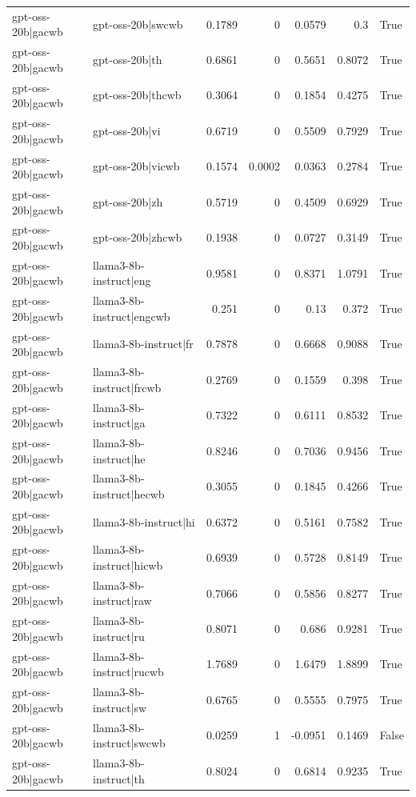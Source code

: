 \begin{table}
\begin{tabular}{l l r r r r l}
gpt-oss-20b|gacwb & gpt-oss-20b|swcwb & 0.1789 & 0 & 0.0579 & 0.3 & True \\
gpt-oss-20b|gacwb & gpt-oss-20b|th & 0.6861 & 0 & 0.5651 & 0.8072 & True \\
gpt-oss-20b|gacwb & gpt-oss-20b|thcwb & 0.3064 & 0 & 0.1854 & 0.4275 & True \\
gpt-oss-20b|gacwb & gpt-oss-20b|vi & 0.6719 & 0 & 0.5509 & 0.7929 & True \\
gpt-oss-20b|gacwb & gpt-oss-20b|vicwb & 0.1574 & 0.0002 & 0.0363 & 0.2784 & True \\
gpt-oss-20b|gacwb & gpt-oss-20b|zh & 0.5719 & 0 & 0.4509 & 0.6929 & True \\
gpt-oss-20b|gacwb & gpt-oss-20b|zhcwb & 0.1938 & 0 & 0.0727 & 0.3149 & True \\
gpt-oss-20b|gacwb & llama3-8b-instruct|eng & 0.9581 & 0 & 0.8371 & 1.0791 & True \\
gpt-oss-20b|gacwb & llama3-8b-instruct|engcwb & 0.251 & 0 & 0.13 & 0.372 & True \\
gpt-oss-20b|gacwb & llama3-8b-instruct|fr & 0.7878 & 0 & 0.6668 & 0.9088 & True \\
gpt-oss-20b|gacwb & llama3-8b-instruct|frcwb & 0.2769 & 0 & 0.1559 & 0.398 & True \\
gpt-oss-20b|gacwb & llama3-8b-instruct|ga & 0.7322 & 0 & 0.6111 & 0.8532 & True \\
gpt-oss-20b|gacwb & llama3-8b-instruct|he & 0.8246 & 0 & 0.7036 & 0.9456 & True \\
gpt-oss-20b|gacwb & llama3-8b-instruct|hecwb & 0.3055 & 0 & 0.1845 & 0.4266 & True \\
gpt-oss-20b|gacwb & llama3-8b-instruct|hi & 0.6372 & 0 & 0.5161 & 0.7582 & True \\
gpt-oss-20b|gacwb & llama3-8b-instruct|hicwb & 0.6939 & 0 & 0.5728 & 0.8149 & True \\
gpt-oss-20b|gacwb & llama3-8b-instruct|raw & 0.7066 & 0 & 0.5856 & 0.8277 & True \\
gpt-oss-20b|gacwb & llama3-8b-instruct|ru & 0.8071 & 0 & 0.686 & 0.9281 & True \\
gpt-oss-20b|gacwb & llama3-8b-instruct|rucwb & 1.7689 & 0 & 1.6479 & 1.8899 & True \\
gpt-oss-20b|gacwb & llama3-8b-instruct|sw & 0.6765 & 0 & 0.5555 & 0.7975 & True \\
gpt-oss-20b|gacwb & llama3-8b-instruct|swcwb & 0.0259 & 1 & -0.0951 & 0.1469 & False \\
gpt-oss-20b|gacwb & llama3-8b-instruct|th & 0.8024 & 0 & 0.6814 & 0.9235 & True \\

\end{tabular}
\end{table}
